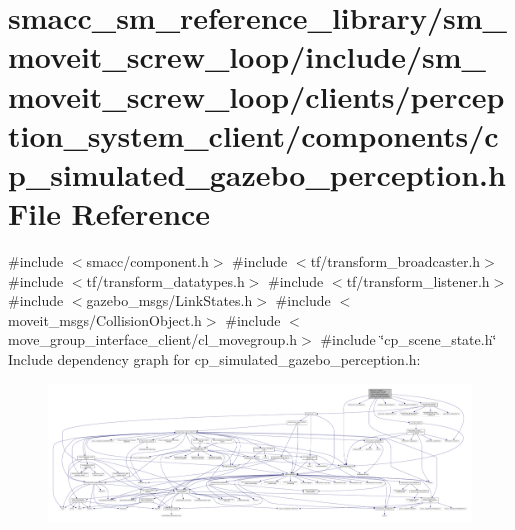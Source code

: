 \hypertarget{sm__moveit__screw__loop_2include_2sm__moveit__screw__loop_2clients_2perception__system__client_23d4c1f64f87d25d974d8ffd55c752b87}{}\section{smacc\+\_\+sm\+\_\+reference\+\_\+library/sm\+\_\+moveit\+\_\+screw\+\_\+loop/include/sm\+\_\+moveit\+\_\+screw\+\_\+loop/clients/perception\+\_\+system\+\_\+client/components/cp\+\_\+simulated\+\_\+gazebo\+\_\+perception.h File Reference}
\label{sm__moveit__screw__loop_2include_2sm__moveit__screw__loop_2clients_2perception__system__client_23d4c1f64f87d25d974d8ffd55c752b87}
{\ttfamily \#include $<$smacc/component.\+h$>$}\newline
{\ttfamily \#include $<$tf/transform\+\_\+broadcaster.\+h$>$}\newline
{\ttfamily \#include $<$tf/transform\+\_\+datatypes.\+h$>$}\newline
{\ttfamily \#include $<$tf/transform\+\_\+listener.\+h$>$}\newline
{\ttfamily \#include $<$gazebo\+\_\+msgs/\+Link\+States.\+h$>$}\newline
{\ttfamily \#include $<$moveit\+\_\+msgs/\+Collision\+Object.\+h$>$}\newline
{\ttfamily \#include $<$move\+\_\+group\+\_\+interface\+\_\+client/cl\+\_\+movegroup.\+h$>$}\newline
{\ttfamily \#include \char`\"{}cp\+\_\+scene\+\_\+state.\+h\char`\"{}}\newline
Include dependency graph for cp\+\_\+simulated\+\_\+gazebo\+\_\+perception.\+h\+:
\nopagebreak
\begin{figure}[H]
\begin{center}
\leavevmode
\includegraphics[width=350pt]{sm__moveit__screw__loop_2include_2sm__moveit__screw__loop_2clients_2perception__system__client_20d46c2fe9608cb5c9c5a9555800a5e55}
\end{center}
\end{figure}
